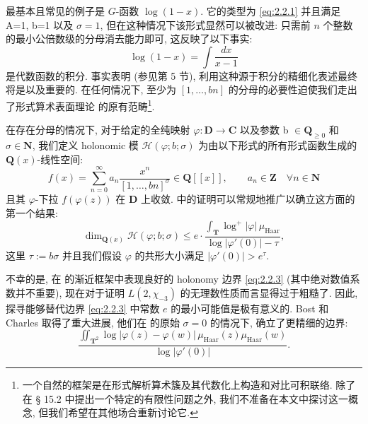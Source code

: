 最基本且常见的例子是 \(G\)-函数 \(\log(1-x)\). 
它的类型为 \eqref{eq:2.2.1} 并且满足 A=1, b=1 以及 \(\sigma=1\), 
但在这种情况下该形式显然可以被改进: 只需前 $n$ 个整数的最小公倍数级的分母消去能力即可, 这反映了以下事实:
\[ \log(1-x) = \int \frac{dx}{x-1} \]
是代数函数的积分. 
事实表明 (参见第 5 节), 利用这种源于积分的精细化表述最终将是以及重要的.
在任何情况下, 至少为 \([1, \dots, bn]\) 的分母的必要性迫使我们走出了形式算术表面理论 \cite{BC22} 的原有范畴\footnote{一个自然的框架是在形式解析算术簇及其代数化上构造和对比可积联络. 除了在 § 15.2 中提出一个特定的有限性问题之外, 我们不准备在本文中探讨这一概念, 但我们希望在其他场合重新讨论它.}.

在存在分母的情况下, 对于给定的全纯映射 \(\varphi : \mathbf{D} \to \mathbf{C}\) 以及参数 b \(\in \mathbf{Q}_{\ge 0}\) 和 \(\sigma \in \mathbf{N}\), 
我们定义 holonomic 模 \(\mathcal{H}(\varphi; b; \sigma)\) 为由以下形式的所有形式函数生成的 \(\mathbf{Q}(x)\)-线性空间:
\begin{equation}\label{eq:2.2.2}
f(x) = \sum_{n=0}^{\infty} a_n \frac{x^n}{[1, \dots, bn]^{\sigma}} \in \mathbf{Q}[\![x]\!], \qquad a_n \in \mathbf{Z} \quad \forall n \in \mathbf{N}
\end{equation}
且其 \(\varphi\)-下拉 \(f(\varphi(z))\) 在 \(\mathbf{D}\) 上收敛. 
\cite[§ 2]{CDT21} 中的证明可以常规地推广以确立这方面的第一个结果:
\begin{equation}\label{eq:2.2.3}
\dim_{\mathbf{Q}(x)} \mathcal{H}(\varphi; b; \sigma) \le e \cdot \frac{\int_{\mathbf{T}} \log^{+} \lvert\varphi\rvert \, \mu_{\text{Haar}}}{\log \lvert\varphi'(0)\rvert - \tau},
\end{equation}
这里 \(\tau := b\sigma\) 并且我们假设 \(\varphi\) 的共形大小满足 \(\lvert\varphi'(0)\rvert > e^{\tau}\).

不幸的是, 在 \cite{CDT21} 的渐近框架中表现良好的 holonomy 边界 \eqref{eq:2.2.3} (其中绝对数值系数并不重要), 
现在对于证明 \(L(2, \chi_{-3})\) 的无理数性质而言显得过于粗糙了.
因此, 探寻能够替代边界 \eqref{eq:2.2.3} 中常数 $e$ 的最小可能值是极有意义的.
Bost 和 Charles \cite[Corollary 8.3.5]{BC22} 取得了重大进展, 
他们在 \cite{CDT21} 的原始 \(\sigma = 0\) 的情况下, 确立了更精细的边界:
\begin{equation}\label{eq:2.2.4}
\frac{\iint_{\mathbf{T}^2} \log \lvert\varphi(z) - \varphi(w)\rvert \,\mu_{\text{Haar}}(z)\mu_{\text{Haar}}(w)}{\log \lvert\varphi'(0)\rvert}.
\end{equation}

